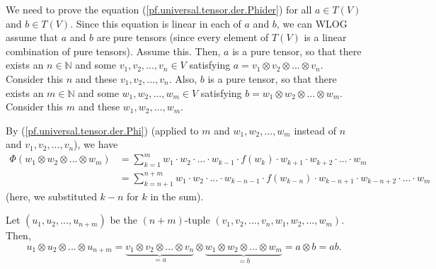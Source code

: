 \documentclass[etingof-lie.tex]{subfiles}
\begin{document}
We need to prove the equation (\ref{pf.universal.tensor.der.Phider}) for all
$a\in T\left(  V\right)  $ and $b\in T\left(  V\right)  $. Since this equation
is linear in each of $a$ and $b$, we can WLOG assume that $a$ and $b$ are pure
tensors (since every element of $T\left(  V\right)  $ is a linear combination
of pure tensors). Assume this. Then, $a$ is a pure tensor, so that there
exists an $n\in\mathbb{N}$ and some $v_{1},v_{2},...,v_{n}\in V$ satisfying
$a=v_{1}\otimes v_{2}\otimes...\otimes v_{n}$. Consider this $n$ and these
$v_{1},v_{2},...,v_{n}$. Also, $b$ is a pure tensor, so that there exists an
$m\in\mathbb{N}$ and some $w_{1},w_{2},...,w_{m}\in V$ satisfying
$b=w_{1}\otimes w_{2}\otimes...\otimes w_{m}$. Consider this $m$ and these
$w_{1},w_{2},...,w_{m}$.

By (\ref{pf.universal.tensor.der.Phi}) (applied to $m$ and $w_{1}%
,w_{2},...,w_{m}$ instead of $n$ and $v_{1},v_{2},...,v_{n}$), we have%
\begin{align*}
\Phi\left(  w_{1}\otimes w_{2}\otimes...\otimes w_{m}\right)   &
=\sum\limits_{k=1}^{m}w_{1}\cdot w_{2}\cdot...\cdot w_{k-1}\cdot f\left(
w_{k}\right)  \cdot w_{k+1}\cdot w_{k+2}\cdot...\cdot w_{m}\\
&  =\sum\limits_{k=n+1}^{n+m}w_{1}\cdot w_{2}\cdot...\cdot w_{k-n-1}\cdot
f\left(  w_{k-n}\right)  \cdot w_{k-n+1}\cdot w_{k-n+2}\cdot...\cdot w_{m}%
\end{align*}
(here, we substituted $k-n$ for $k$ in the sum).

Let $\left(  u_{1},u_{2},...,u_{n+m}\right)  $ be the $\left(  n+m\right)
$-tuple $\left(  v_{1},v_{2},...,v_{n},w_{1},w_{2},...,w_{m}\right)  $. Then,
\[
u_{1}\otimes u_{2}\otimes...\otimes u_{n+m}=\underbrace{v_{1}\otimes
v_{2}\otimes...\otimes v_{n}}_{=a}\otimes\underbrace{w_{1}\otimes w_{2}%
\otimes...\otimes w_{m}}_{=b}=a\otimes b=ab.
\]
\end{document}
